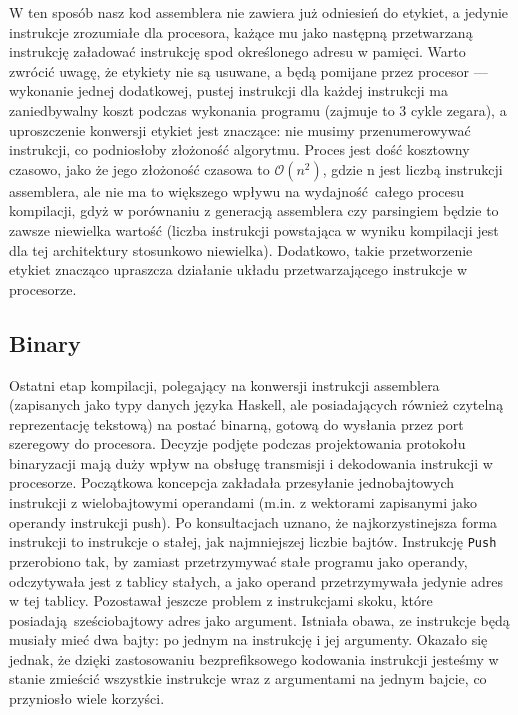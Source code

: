 W ten sposób nasz kod assemblera nie zawiera już odniesień do etykiet, a jedynie instrukcje zrozumiałe dla procesora, każące mu jako następną przetwarzaną instrukcję załadować instrukcję spod określonego adresu w pamięci. Warto zwrócić uwagę, że etykiety nie są usuwane, a będą pomijane przez procesor --- wykonanie jednej dodatkowej, pustej instrukcji dla każdej instrukcji ma zaniedbywalny koszt podczas wykonania programu (zajmuje to 3 cykle zegara), a uproszczenie konwersji etykiet jest znaczące: nie musimy przenumerowywać instrukcji, co podniosłoby złożoność algorytmu. Proces jest dość kosztowny czasowo, jako że jego złożoność czasowa to $\mathcal{O}(n^2)$, gdzie n jest liczbą instrukcji assemblera, ale nie ma to większego wpływu na wydajność całego procesu kompilacji, gdyż w porównaniu z generacją assemblera czy parsingiem będzie to zawsze niewielka wartość (liczba instrukcji powstająca w wyniku kompilacji jest dla tej architektury stosunkowo niewielka). Dodatkowo, takie przetworzenie etykiet znacząco upraszcza działanie układu przetwarzającego instrukcje w procesorze.


\subsection{Binary}

Ostatni etap kompilacji, polegający na konwersji instrukcji assemblera (zapisanych jako typy danych języka Haskell, ale posiadających również czytelną reprezentację tekstową) na postać binarną, gotową do wysłania przez port szeregowy do procesora. Decyzje podjęte podczas projektowania protokołu binaryzacji mają duży wpływ na obsługę transmisji i dekodowania instrukcji w procesorze. Początkowa koncepcja zakładała przesyłanie jednobajtowych instrukcji z wielobajtowymi operandami (m.in. z wektorami zapisanymi jako operandy instrukcji push). Po konsultacjach uznano, że najkorzystinejsza forma instrukcji to instrukcje o stałej, jak najmniejszej liczbie bajtów. Instrukcję \texttt{Push} przerobiono tak, by zamiast przetrzymywać stałe programu jako operandy, odczytywała jest z tablicy stałych, a jako operand przetrzymywała jedynie adres w tej tablicy. Pozostawał jeszcze problem z instrukcjami skoku, które posiadają sześciobajtowy adres jako argument. Istniała obawa, ze instrukcje będą musiały mieć dwa bajty: po jednym na instrukcję i jej argumenty. Okazało się jednak, że dzięki zastosowaniu bezprefiksowego kodowania instrukcji jesteśmy w stanie zmieścić wszystkie instrukcje wraz z argumentami na jednym bajcie, co przyniosło wiele korzyści.

